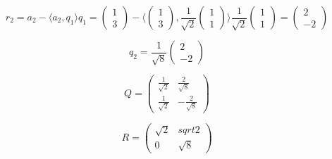\[ 
    r_2 = a_2 - \langle a_2, q_1\rangle q_1 
    = 
    \begin{pmatrix} 1 \\ 3 \end{pmatrix}
    - 
    \langle  
    \begin{pmatrix} 1 \\ 3 \end{pmatrix}
    ,
    \frac{1}{\sqrt{2}} \begin{pmatrix} 1 \\ 1 \end{pmatrix}
    \rangle    
    \frac{1}{\sqrt{2}} 
    \begin{pmatrix} 1 \\ 1 \end{pmatrix}
    = 
    \begin{pmatrix}
        2 \\ -2 
    \end{pmatrix}
\]

\[
    q_2 =
    \frac{1}{\sqrt{8}}
    \begin{pmatrix}
        2 \\ -2 
    \end{pmatrix}
\]

\[
    Q = 
    \begin{pmatrix}
        \frac{1}{\sqrt{2}} & \frac{2}{\sqrt{8}} \\
        \frac{1}{\sqrt{2}} & -\frac{2}{\sqrt{8}}
    \end{pmatrix}
\]

\[
    R =
    \begin{pmatrix}
        \sqrt{2} & sqrt{2} \\
        0    &    \sqrt{8}
    \end{pmatrix}
\]

